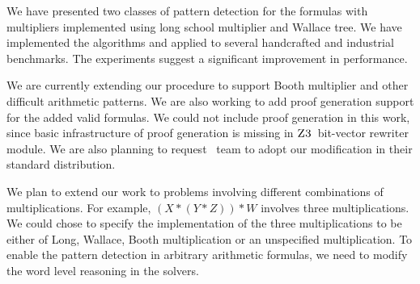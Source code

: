 We have presented two classes of pattern detection for the formulas with
multipliers implemented using long school multiplier and Wallace tree.
%
We have implemented the algorithms and applied to several handcrafted and 
industrial benchmarks.
%
The experiments suggest a significant improvement in performance.

We are currently extending our procedure to support Booth multiplier
and other difficult arithmetic patterns.
%
We are also working to add proof generation support
for the added valid formulas.
%
We could not include proof generation in this work, since basic infrastructure
of proof generation is missing in $\textsc{Z3}$~bit-vector rewriter module.
%
We are also planning to request \zthree~team to adopt our modification in their
standard distribution.


We plan to extend our work to problems involving different combinations of multiplications. For example, $(X*(Y*Z))*W$ involves three multiplications. We could chose to specify the implementation of the three multiplications to be either of Long, Wallace, Booth multiplication or an unspecified multiplication. To enable the pattern detection in arbitrary arithmetic formulas, we need to modify the word level reasoning in the solvers.  





